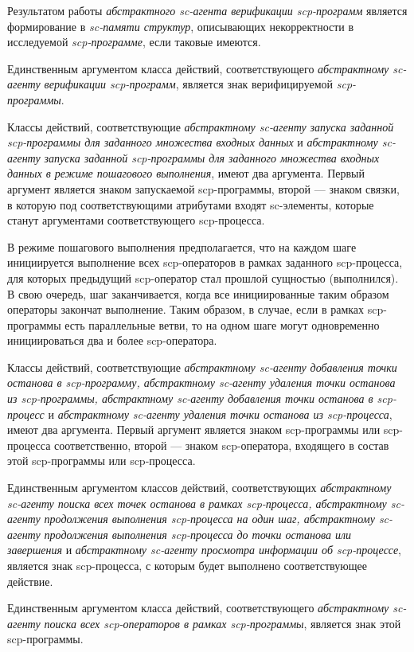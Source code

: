 Результатом работы \textit{абстрактного sc-агента верификации scp-программ} является формирование в \textit{sc-памяти структур}, описывающих некорректности в исследуемой \textit{scp-программе}, если таковые имеются.

Единственным аргументом класса действий, соответствующего \textit{абстрактному sc-агенту верификации scp-программ}, является знак верифицируемой \textit{scp-программы}.

Классы действий, соответствующие \textit{абстрактному sc-агенту запуска заданной scp-программы для заданного множества входных данных} и \textit{абстрактному sc-агенту запуска заданной scp-программы для заданного множества входных данных в режиме пошагового выполнения}, имеют два аргумента. Первый аргумент является знаком запускаемой scp-программы, второй --- знаком связки, в которую под соответствующими атрибутами входят sc-элементы, которые станут аргументами соответствующего scp-процесса.

В режиме пошагового выполнения предполагается, что на каждом шаге инициируется выполнение всех scp-операторов в рамках заданного scp-процесса, для которых предыдущий scp-оператор стал прошлой сущностью (выполнился). В свою очередь, шаг заканчивается, когда все инициированные таким образом операторы закончат выполнение. Таким образом, в случае, если в рамках scp-программы есть параллельные ветви, то на одном шаге могут одновременно инициироваться два и более scp-оператора.

Классы действий, соответствующие \textit{абстрактному sc-агенту добавления точки останова в scp-программу, абстрактному sc-агенту удаления точки останова из scp-программы, абстрактному sc-агенту добавления точки останова в scp-процесс} и \textit{абстрактному sc-агенту удаления точки останова из scp-процесса}, имеют два аргумента. Первый аргумент является знаком scp-программы или scp-процесса соответственно, второй --- знаком scp-оператора, входящего в состав этой scp-программы или scp-процесса.

Единственным аргументом классов действий, соответствующих \textit{абстрактному sc-агенту поиска всех точек останова в рамках scp-процесса, абстрактному sc-агенту продолжения выполнения scp-процесса на один шаг, абстрактному sc-агенту продолжения выполнения scp-процесса до точки останова или завершения} и \textit{абстрактному sc-агенту просмотра информации об scp-процессе}, является знак scp-процесса, с которым будет выполнено соответствующее действие.

Единственным аргументом класса действий, соответствующего \textit{абстрактному sc-агенту поиска всех scp-операторов в рамках scp-программы}, является знак этой scp-программы.

